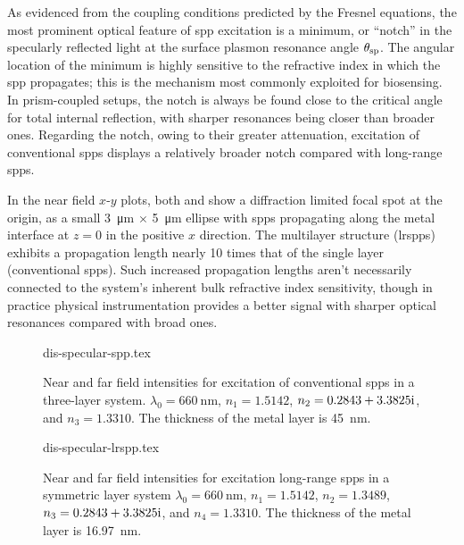 As evidenced from the coupling conditions predicted by the Fresnel equations,
the most prominent optical feature of \gls{spp} excitation is a minimum, or
``notch'' in the specularly reflected light at the surface plasmon resonance
angle $\theta_\mathrm{sp}$.  The angular location of the minimum is highly sensitive to
the refractive index in which the \gls{spp} propagates; this is the mechanism most
commonly exploited for biosensing.  In prism-coupled setups, the notch is
always be found close to the critical angle for total internal reflection,
with sharper resonances being closer than broader ones.  Regarding the notch,
owing to their greater attenuation, excitation of conventional \glspl{spp} displays
a relatively broader notch compared with long-range \glspl{spp}.

In the near field $x$-$y$ plots, both  and
 show a diffraction limited focal spot at
the origin, as a small \SI{3}{\micro\meter} $\times$ \SI{5}{\micro\meter} ellipse with \glspl{spp} propagating
along the metal interface at $z=0$ in the positive $x$ direction.  The
multilayer structure (\glspl{lrspp}) exhibits a propagation length nearly 10 times
that of the single layer (conventional \glspl{spp}).  Such increased propagation
lengths aren't necessarily connected to the system's inherent bulk
refractive index sensitivity, though in practice physical instrumentation
provides a better signal with sharper optical resonances compared with
broad ones.

\begin{figure}[ht]
	\centering
	{dis-specular-spp.tex}
	\caption{Near and far field intensities for excitation of conventional \glspl{spp}
		in a three-layer system. $\lambda_0=\SI{660}{\nano\meter}$, $n_1 =
			\num{1.5142}$, $n_2=\complexnum{0.2843 + 3.3825i}$, and $n_3=1.3310$.  The thickness of the metal layer is
		\SI{45}{\nano\meter}.}
	\label{fig:fresnelnearfieldspp}
\end{figure}

\begin{figure}[ht]
	\centering
	{dis-specular-lrspp.tex}
	\caption{Near and far field intensities for excitation long-range \glspl{spp} in a
		symmetric layer system $\lambda_0=\SI{660}{\nano\meter}$, $n_1 =
			\num{1.5142}$, $n_2=1.3489$, $n_3=\complexnum{0.2843 + 3.3825i}$, and
		$n_4=1.3310$.  The thickness of the metal layer is
		\SI{16.97}{\nano\meter}.}
	\label{fig:fresnelnearfieldlrspp}
\end{figure}

